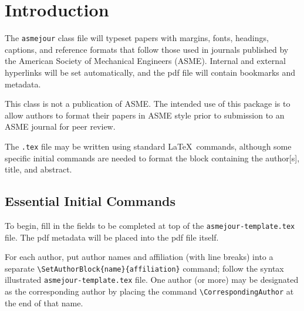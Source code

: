 \documentclass[largesc,upint,varvw,barcolor=Red4,nocopyright,hyphenate,balance,lang-second=french,lang=english]{asmejour}
\begin{document}
\date{Version \versionno, \today} %

\maketitle %



\section{Introduction}

The \texttt{asmejour} class file will typeset papers with margins, fonts, headings, captions, and reference formats that follow those used in journals published by the American Society of Mechanical Engineers (ASME). Internal and external hyperlinks will be set automatically, and the pdf file will contain bookmarks and metadata.

This class is not a publication of ASME. The intended use of this package is to allow authors to format their papers in ASME style prior to submission to an ASME journal for peer review.

The \texttt{.tex} file may be written using standard \LaTeX\ commands, although some specific initial commands are needed to format the block containing the author[s], title, and abstract.

\subsection{Essential Initial Commands}
To begin, fill in the fields to be completed at top of the \texttt{asmejour-template.tex} file. The pdf metadata will be placed into the pdf file itself. 

For each author, put author names and affiliation (with line breaks) into a separate \verb|\SetAuthorBlock{name}{affiliation}| command; follow the syntax illustrated \texttt{asmejour-template.tex} file.  One author (or more) may be designated as the corresponding author  by placing the command \verb|\CorrespondingAuthor| at the end of that name.  
\end{document}
